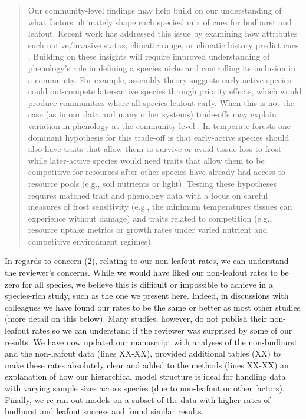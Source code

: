 \documentclass[11pt,a4paper]{article}
\begin{document}
\begin{quote}
Our community-level findings may help build on our understanding of what factors ultimately shape each species' mix of cues for budburst and leafout. Recent work has addressed this issue by examining how attributes such native/invasive status, climatic range, or climatic history predict cues \citep[e.g.,][]{Laube2015,zohner2017}. Building on these insights will require improved understanding of phenology's role in defining a species niche and controlling its inclusion in a community. For example, assembly theory suggests early-active species could out-compete later-active species through priority effects, which would produce communities where all species leafout early. When this is not the case (as in our data and many other systems) trade-offs may explain variation in phenology at the community-level \citep{Chesson:1997dz}. In temperate forests one dominant hypothesis for this trade-off is that early-active species should also have traits that allow them to survive or avoid tissue loss to frost \citep{Sakai:1987aa} while later-active species would need traits that allow them to be competitive for resources after other species have already had access to resource pools (e.g., soil nutrients or light). Testing these hypotheses requires matched trait and phenology data with a focus on careful measures of frost sensitivity (e.g., the minimum temperatures tissues can experience without damage) and traits related to competition (e.g., resource uptake metrics or growth rates under varied nutrient and competitive environment regimes).
\end{quote}

In regards to concern (2), relating to our non-leafout rates, we can understand the reviewer's concerns. While we would have liked our non-leafout rates to be zero for all species, we believe this is difficult or impossible to achieve in a species-rich study, such as the one we present here. Indeed, in discussions with colleagues we have found our rates to be the same or better as most other studies (more detail on this below). Many studies, however, do not publish their non-leafout rates so we can understand if the reviewer was surprised by some of our results. We have now updated our manuscript with analyses of the non-budburst and the non-leafout data (lines XX-XX), provided additional tables (XX) to make these rates absolutely clear and added to the methods (lines XX-XX) an explanation of how our hierarchical model structure is ideal for handling data with varying sample sizes across species (due to non-leafout or other factors). Finally, we re-ran out models on a subset of the data with higher rates of budburst and leafout success and found similar results. \\
\end{document}
